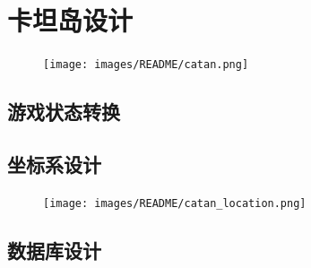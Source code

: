 \documentclass[export, 12pt, letterpaper]{ctexrep}
\begin{document}
\chapter{卡坦岛设计}
\begin{center}\begin{figure}[H] \centering \texttt{[image: images/README/catan.png]}\caption*{}
\end{figure} \end{center}

\section{游戏状态转换}


\section{坐标系设计}
\begin{center}\begin{figure}[H] \centering \texttt{[image: images/README/catan\_location.png]}\caption*{}
\end{figure} \end{center}


\section{数据库设计}
\end{document}
